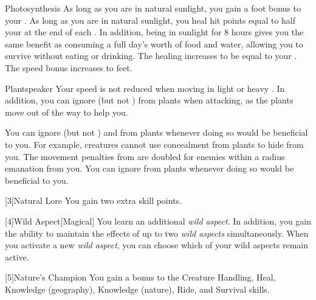 {            \begin{freeability}{Photosynthesis}
                As long as you are in natural sunlight, you gain a  foot bonus to your .
                \rankline
                 As long as you are in natural sunlight, you heal hit points equal to half your  at the end of each .
                In addition, being in sunlight for 8 hours gives you the same benefit as consuming a full day's worth of food and water, allowing you to survive without eating or drinking.
                 The healing increases to be equal to your .
                 The speed bonus increases to  feet.
            \end{freeability}

            \begin{freeability}{Plantspeaker}
                Your speed is not reduced when moving in light or heavy .
                In addition, you can ignore  (but not ) from plants when attacking, as the plants move out of the way to help you.

                \rankline
                 You can ignore  (but not ) and  from plants whenever doing so would be beneficial to you.
                For example, creatures cannot use concealment from plants to hide from you.
                 The movement penalties from  are doubled for enemies within a \areahuge radius emanation from you.
                 You can ignore  from plants whenever doing so would be beneficial to you.
            \end{freeability}
        }

        [3]{Natural Lore}
        You gain two extra skill points.

        [4]{Wild Aspect}[Magical]
        You learn an additional \textit{wild aspect}.
        In addition, you gain the ability to maintain the effects of up to two \textit{wild aspects} simultaneously.
        When you activate a new \textit{wild aspect}, you can choose which of your wild aspects remain active. 

        [5]{Nature's Champion}
        You gain a  bonus to the Creature Handling, Heal, Knowledge (geography), Knowledge (nature), Ride, and Survival skills.


